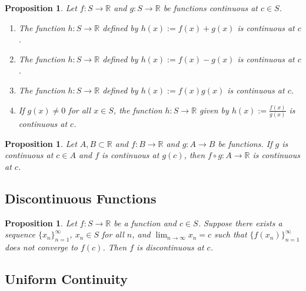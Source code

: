\documentclass{article}
\newtheorem{prop}[theorem]{Proposition}
\theoremstyle{definition}
\begin{document}
\begin{prop}
    Let \( f: S \rightarrow \mathbb{R} \) and \( g: S \rightarrow \mathbb{R} \) be functions continuous at \( c \in S \).

    \begin{enumerate}[label=(\roman*)]
        \item The function \( h: S \rightarrow \mathbb{R} \) defined by \( h(x) := f(x) + g(x) \) is continuous at \( c \).
        \item The function \( h: S \rightarrow \mathbb{R} \) defined by \( h(x) := f(x) - g(x) \) is continuous at \( c \).
        \item The function \( h: S \rightarrow \mathbb{R} \) defined by \( h(x) := f(x) g(x) \) is continuous at \( c \).
        \item If \( g(x) \neq 0 \) for all \( x \in S \), the function \( h: S \rightarrow \mathbb{R} \) given by \( h(x) := \frac{f(x)}{g(x)} \) is continuous at \( c \).
    \end{enumerate}
\end{prop}

\begin{prop}
    Let \( A, B \subset \mathbb{R} \) and \( f: B \rightarrow \mathbb{R} \) and \( g: A \rightarrow B \) be functions. If \( g \) is continuous at \( c \in A \) and \( f \) is continuous at \( g(c) \), then \( f \circ g: A \rightarrow \mathbb{R} \) is continuous at \( c \).    
\end{prop}





\subsection{Discontinuous Functions}

\begin{prop}
    Let \( f: S \rightarrow \mathbb{R} \) be a function and \( c \in S \). Suppose there exists a sequence \( \{x_n\}_{n=1}^{\infty} \), \( x_n \in S \) for all \( n \), and \( \lim_{n \to \infty} x_n = c \) such that \( \{f(x_n)\}_{n=1}^{\infty} \) does not converge to \( f(c) \). Then \( f \) is discontinuous at \( c \).
\end{prop}




\subsection{Uniform Continuity}
\end{document}
